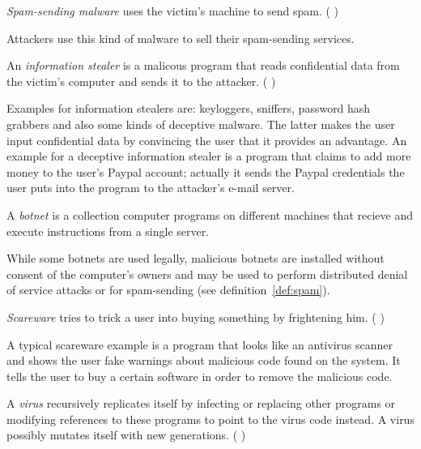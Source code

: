 \begin{definition}
\emph{Spam-sending malware} uses the victim's machine to send spam. (\cf{} \cite[]{sikorski12}) \label{def:spam}
\end{definition}

Attackers use this kind of malware to sell their spam-sending services.

\begin{definition}
An \emph{information stealer} is a malicous program that reads confidential data from the victim's computer and sends it to the attacker. (\cf{} \cite[]{sikorski12})
\end{definition} 

Examples for information stealers are: keyloggers, sniffers, password hash grabbers \cite[]{sikorski12} and also some kinds of deceptive malware. The latter makes the user input confidential data by convincing the user that it provides an advantage. An example for a deceptive information stealer is a program that claims to add more money to the user's Paypal account; actually it sends the Paypal credentials the user puts into the program to the attacker's e-mail server.

\begin{definition}[Botnet]
A \emph{botnet} is a collection computer programs on different machines that recieve and execute instructions from a single server.
\end{definition} 

While some botnets are used legally, malicious botnets are installed without consent of the computer's owners and may be used to perform distributed denial of service attacks or for spam-sending (see definition~\ref{def:spam}).

\begin{definition}[Scareware]
\emph{Scareware} tries to trick a user into buying something by frightening him. (\cf{} \cite[]{sikorski12})
\end{definition} 

A typical scareware example is a program that looks like an antivirus scanner and shows the user fake warnings about malicious code found on the system. It tells the user to buy a certain software in order to remove the malicious code.

\begin{definition}[Virus]
A \emph{virus} recursively replicates itself by infecting or replacing other programs or modifying references to these programs to point to the virus code instead. A virus possibly mutates itself with new generations. (\cf{} \cite[]{szor05})
\end{definition} 

